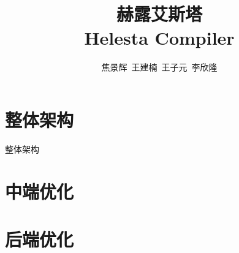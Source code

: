 \documentclass[aspectratio=169,UTF-8]{ctexbeamer}
\title{赫露艾斯塔\\ Helesta Compiler}
\author{焦景辉\ 王建楠\ 王子元\ 李欣隆}
\institute{清华大学}
\begin{document}
	\maketitle
	
	\begin{frame}
		\tableofcontents
	\end{frame}
	
	\section{整体架构}
	
		\begin{frame}{整体架构}
			
		\end{frame}
			
	\section{中端优化}
	
	\section{后端优化}
	
\end{document}
